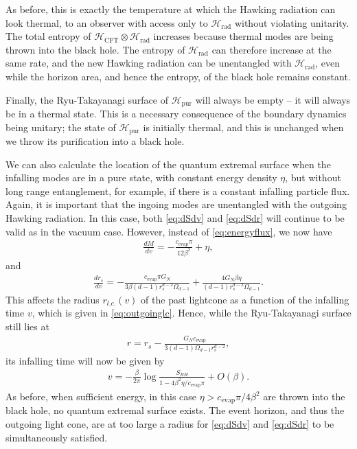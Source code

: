 \documentclass[12pt]{article}
\begin{document}
As before, this is exactly the temperature at which the Hawking radiation can look thermal, to an observer with access only to $\mathcal{H}_\text{rad}$ without violating unitarity. The total entropy of $\mathcal{H}_\text{CFT} \otimes \mathcal{H}_\text{rad}$ increases because thermal modes are being thrown into the black hole. The entropy of $\mathcal{H}_\text{rad}$ can therefore increase at the same rate, and the new Hawking radiation can be unentangled with $\mathcal{H}_\text{rad}$, even while the horizon area, and hence the entropy, of the black hole remains constant.

Finally, the Ryu-Takayanagi surface of $\mathcal{H}_\text{pur}$ will always be empty -- it will always be in a thermal state. This is a necessary consequence of the boundary dynamics being unitary; the state of $\mathcal{H}_\text{pur}$ is initially thermal, and this is unchanged when we throw its purification into a black hole.

We can also calculate the location of the quantum extremal surface when the infalling modes are in a pure state, with constant energy density $\eta$, but without long range entanglement, for example, if there is a constant infalling particle flux. Again, it is important that the ingoing modes are unentangled with the outgoing Hawking radiation. In this case, both \eqref{eq:dSdv} and \eqref{eq:dSdr} will continue to be valid as in the vacuum case. However, instead of \eqref{eq:energyflux}, we now have
\begin{align}
\frac{d M}{d v} = - \frac{c_\text{evap} \pi}{12 \beta^2} + \eta,
\end{align}
and
\begin{align}
\frac{d r_s}{d v} = -\frac{c_\text{evap} \pi G_N}{3 \beta (d-1) r_s^{d-2} \Omega_{d-1}} +\frac{4 G_N \beta \eta}{(d-1) r_s^{d-2} \Omega_{d-1}}.
\end{align}
This affects the radius $r_{l.c.}(v)$ of the past lightcone as a function of the infalling time $v$, which is given in \eqref{eq:outgoinglc}. Hence, while the Ryu-Takayanagi surface still lies at
\begin{align}
r = r_s - \frac{G_N c_\text{evap}}{3(d-1)\Omega_{d-1}r_s^{d-2}},
\end{align}
its infalling time will now be given by
\begin{align}
v = -\frac{\beta}{2 \pi} \log \frac{S_{BH}}{1 - 4 \beta^2 \eta/c_\text{evap} \pi } + O(\beta).
\end{align}
As before, when sufficient energy, in this case $\eta > c_\text{evap} \pi /4 \beta^2$ are thrown into the black hole, no quantum extremal surface exists. The event horizon, and thus the outgoing light cone, are at too large a radius for \eqref{eq:dSdv} and \eqref{eq:dSdr}  to be simultaneously satisfied.
\end{document}
